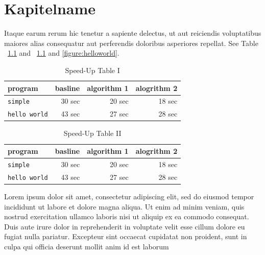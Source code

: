 \chapter{Kapitelname}\label{chapter:kapitellabel} %
 Itaque earum rerum hic tenetur a sapiente delectus, ut aut reiciendis voluptatibus maiores alias consequatur aut perferendis doloribus asperiores repellat\cite{aho:dragonbook}. See Table ~\ref{table:speedup1} and ~\ref{table:speedup1} and \ref{figure:helloworld}.

\begin{table}[!th]
  \renewcommand{\arraystretch}{1.3}
  \caption{Speed-Up Table I}\label{table:speedup1}
  \vspace{4mm} %
  \centering
    \begin{tabular}{|l||r|r|r|}
      \hline      
      program            & basline   & algorithm 1  & alogrithm 2\\
      \hline      
      \hline
      {\tt simple}       &  30 sec   &  20 sec      &  18 sec     \\
      \hline
      {\tt hello world}  &  43 sec   &  27 sec      &  28 sec     \\
      \hline      
    \end{tabular}
\end{table}

\begin{table}[!th]
  \renewcommand{\arraystretch}{1.3}
  \caption{Speed-Up Table II}\label{table:speedup2}
  \vspace{4mm} %
  \centering
    \begin{tabular}{|l||r|r|r|}
      \hline      
      program            & basline   & algorithm 1  & alogrithm 2\\
      \hline      
      \hline
      {\tt simple}       &  30 sec   &  20 sec      &  18 sec     \\
      \hline
      {\tt hello world}  &  43 sec   &  27 sec      &  28 sec     \\
      \hline      
    \end{tabular}
\end{table}
Lorem ipsum dolor sit amet, consectetur adipiscing elit, sed do eiusmod tempor incididunt ut labore et dolore magna aliqua. Ut enim ad minim veniam, quis nostrud exercitation ullamco laboris nisi ut aliquip ex ea commodo consequat. Duis aute irure dolor in reprehenderit in voluptate velit esse cillum dolore eu fugiat nulla pariatur. Excepteur sint occaecat cupidatat non proident, sunt in culpa qui officia deserunt mollit anim id est laborum


